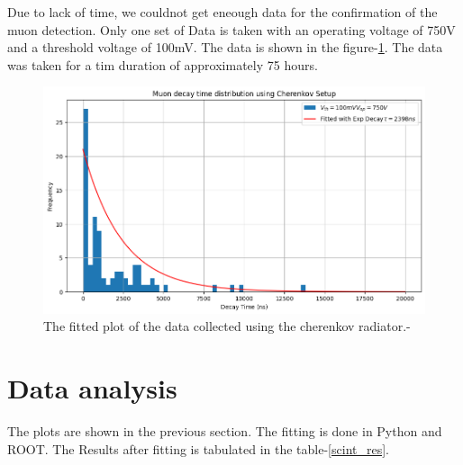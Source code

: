 \documentclass{article}
\begin{document}
\begin{multicols}{2}
Due to lack of time, we couldnot get eneough data for the confirmation of the muon detection. Only one set of Data is taken with an operating voltage of 750V and a threshold voltage of 100mV. The data is shown in the figure-\ref{cherenkovplot}. The data was taken for a tim duration of approximately 75 hours. 
\begin{figure}[H]
    \centering
    \includegraphics[width = \columnwidth]{Images/cher_plots.png}
    \caption{The fitted plot of the data collected using the cherenkov radiator.-\cite{python}}
    \label{cherenkovplot}
\end{figure}



\section{\label{dataanalysis}Data analysis}


The plots are shown in the previous section. The fitting is done in Python and ROOT. The Results after fitting is tabulated in the table-\ref{scint_res}.



\end{multicols}
\end{document}
